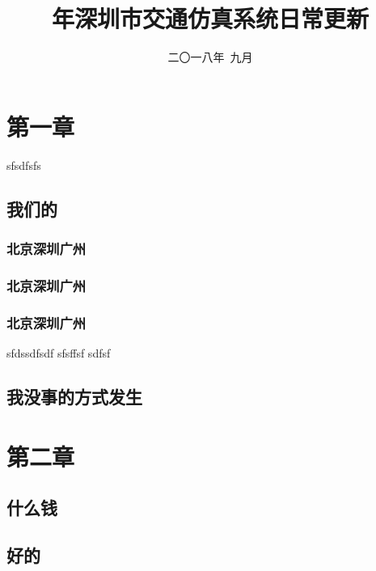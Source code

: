 \documentclass{bookthemeMono}
\title{\cyear 年深圳市交通仿真系统日常更新}
\date{二〇一八年\ 九月}
\begin{document}
\maketitle

\frontmatter

\tableofcontents
\listoffigures
\listoftables

\mainmatter
\chapter{第一章}
sfsdfsfs
\section{我们的}
\subsection{北京深圳广州}
\subsection{北京深圳广州}
\subsection{北京深圳广州}
sfdssdfsdf
sfsffsf
\newpage
sdfsf\\
\clearpage
\section{我没事的方式发生}
\chapter{第二章}
\section{什么钱}
\section{好的}
\end{document}
